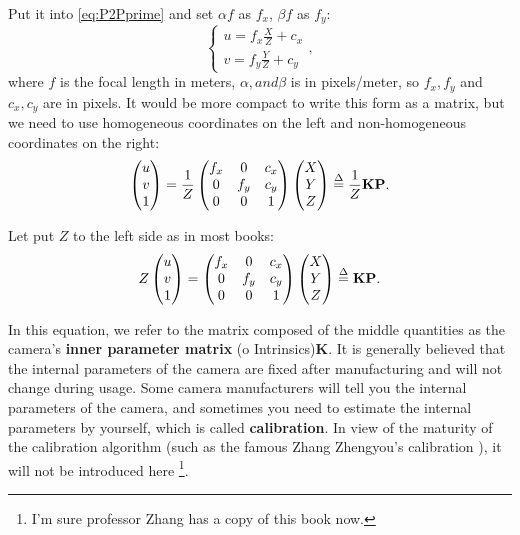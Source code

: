 Put it into \eqref{eq:P2Pprime} and set $\alpha f$ as $f_x$, $\beta f$ as $f_y$:
\begin{equation}
\left\{
\begin{matrix} 
u=f_x\frac{X}{Z} + c_x\\ 
v=f_y\frac{Y}{Z} + c_y
\end{matrix}
\right. ,
\end{equation}
where $f$ is the focal length in meters, $\alpha, and \beta$ is in pixels/meter, so $f_x, f_y$ and $c_x, c_y$ are in pixels. It would be more compact to write this form as a matrix, but we need to use homogeneous coordinates on the left and non-homogeneous coordinates on the right:
\begin{equation}
\label{eq:intrinmatrix} 
\begin{pmatrix} u\\ v\\ 1 \end{pmatrix}=\frac{1}{Z}\begin{pmatrix} f_x & 0&c_x \\ 0& f_y& c_y\\ 0&0 & 1 \end{pmatrix}\begin{pmatrix} X\\ Y\\ Z \end{pmatrix} 
\buildrel \Delta \over =\frac{1}{Z} \mathbf{K} \mathbf{P}.
\end{equation}

Let put $Z$ to the left side as in most books:
\begin{equation}
Z \begin{pmatrix} u\\ v\\ 1 \end{pmatrix}= \begin{pmatrix} f_x & 0&c_x \\ 0& f_y& c_y\\ 0&0 & 1 \end{pmatrix}\begin{pmatrix} X\\ Y\\ Z \end{pmatrix} 
\buildrel \Delta \over = \mathbf{K} \mathbf{P}.
\end{equation}

In this equation, we refer to the matrix composed of the middle quantities as the camera's \textbf{inner parameter matrix} (o Intrinsics)$\mathbf{K}$. It is generally believed that the internal parameters of the camera are fixed after manufacturing and will not change during usage. Some camera manufacturers will tell you the internal parameters of the camera, and sometimes you need to estimate the internal parameters by yourself, which is called \textbf{calibration}. In view of the maturity of the calibration algorithm (such as the famous Zhang Zhengyou's calibration \textsuperscript{\cite{Zhang1999}}), it will not be introduced here \footnote{I'm sure professor Zhang has a copy of this book now.}. 

